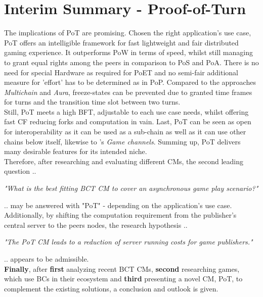 \section{Interim Summary - Proof-of-Turn}
\label{sec:InterimSummary-PoT}
The implications of \gls{PoT} are promising.
Chosen the right application's use case, \gls{PoT} offers an intelligible framework for fast lightweight and fair distributed gaming experience.
It outperforms \gls{PoW} in terms of speed, whilst still managing to grant equal rights among the peers in comparison to \gls{PoS} and \gls{PoA}.
There is no need for special Hardware as required for \gls{PoET} and no semi-fair additional measure for 'effort' has to be determined as in \gls{PoP}.
Compared to the approaches \textit{Multichain} and \textit{Aura}, freeze-states can be prevented due to granted time frames for turns and the transition time slot between two turns. \\
Still, \gls{PoT} meets a high \gls{BFT}, adjustable to each use case needs,
whilst offering fast \gls{CF} reducing forks and computation in vain.
Last, \gls{PoT} can be seen as open for interoperability as it can be used as a sub-chain as well as it can use other chains below itself, likewise to \citet{Kraft.2016}'s \textit{Game channels}.
Summing up, \gls{PoT} delivers many desirable features for its intended niche. \\
Therefore, after researching and evaluating different \gls{CM}s, the second leading question ..
\begin{center}
	\textit{"What is the best fitting \gls{BCT} \gls{CM} to cover an asynchronous game play scenario?"}
\end{center}
\noindent .. may be answered with "\gls{PoT}" - depending on the application's use case.
Additionally, by shifting the computation requirement from the publisher's central server
to the peers nodes, the research hypothesis .. 
\begin{center}
	\textit{"The \gls{PoT} \gls{CM} leads to a reduction of server running costs for game publishers."}
\end{center}
\noindent .. appears to be admissible. \\

\noindent \textbf{Finally}, after \textbf{first} analyzing recent \gls{BCT} \gls{CM}s,
\textbf{second} researching games, which use \gls{BC}s in their ecosystem
and \textbf{third} presenting a novel \gls{CM}, \gls{PoT},
to complement the existing solutions, a conclusion and outlook is given.

